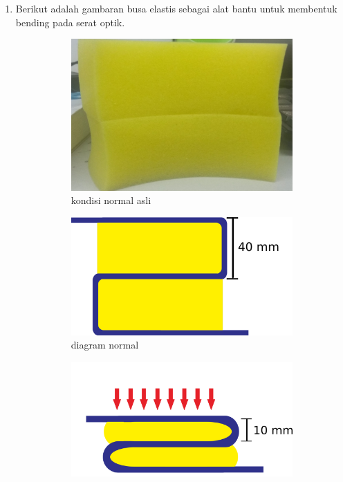 \documentclass[12pt]{article}
\begin{document}
	
	\begin{enumerate}
		\item Berikut adalah gambaran busa elastis sebagai alat bantu untuk membentuk bending pada serat optik.
		
		\begin{figure}[!h]
			\centering
			\captionsetup{justification=centering}
			\begin{subfigure}[b]{0.3\textwidth}
				\includegraphics[width=\textwidth]{images/Bab_4/Bab_4_1a}	
				\caption{\small{kondisi normal asli}}		
			\end{subfigure}
			\begin{subfigure}[b]{0.3\textwidth}
				\includegraphics[width=\linewidth]{images/Bab_4/Bab_4_1b}
				\caption{\small{diagram normal}}			
			\end{subfigure}
			\begin{subfigure}[b]{0.3\textwidth}
				\includegraphics[width=\linewidth]{images/Bab_4/Bab_4_1c}

\end{subfigure}
\end{figure}
\end{enumerate}
\end{document}
